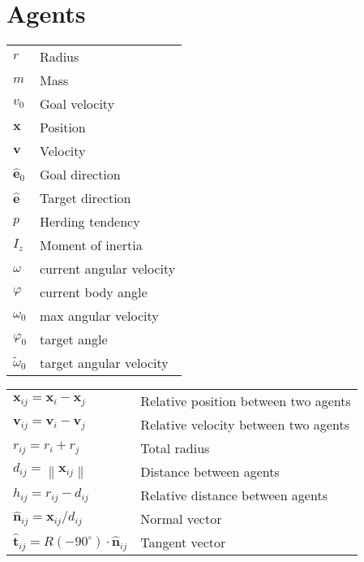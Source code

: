 \section{Agents}
\begin{table}[H]
\centering
\begin{tabular}{ll}
$ r $                    & Radius \\
$ m $                    & Mass \\
$ v_{0} $                & Goal velocity \\  
$ \mathbf{x} $           & Position \\
$ \mathbf{v} $           & Velocity \\
$ \hat{\mathbf{e}}_{0} $ & Goal direction \\
$ \hat{\mathbf{e}} $     & Target direction \\
$ p $                    & Herding tendency \\
$ I_{z} $                & Moment of inertia \\
$ \omega $               & current angular velocity \\
$ \varphi $              & current body angle \\
$ \omega_{0} $           & max angular velocity \\
$ \varphi_{0} $          & target angle \\
$ \tilde{\omega}_{0} $   & target angular velocity \\
\end{tabular}
\end{table}

\begin{table}[H]
\centering
\begin{tabular}{ll}
$ \mathbf{x}_{ij} = \mathbf{x}_{i} - \mathbf{x}_{j} $ & Relative position between two agents \\
$ \mathbf{v}_{ij} = \mathbf{v}_{i} - \mathbf{v}_{j} $ & Relative velocity between two agents \\
$ r_{ij} = r_{i} + r_{j} $ & Total radius \\
$ d_{ij} = \left\|\mathbf{x}_{ij}\right\| $ & Distance between agents \\
$ h_{ij} = r_{ij} - d_{ij} $ & Relative distance between agents \\
$ \hat{\mathbf{n}}_{ij} = \mathbf{x}_{ij} / d_{ij} $ & Normal vector \\
$ \hat{\mathbf{t}}_{ij} = R(-90^{\circ}) \cdot \hat{\mathbf{n}}_{ij} $ & Tangent vector \\
\end{tabular}
\end{table}


